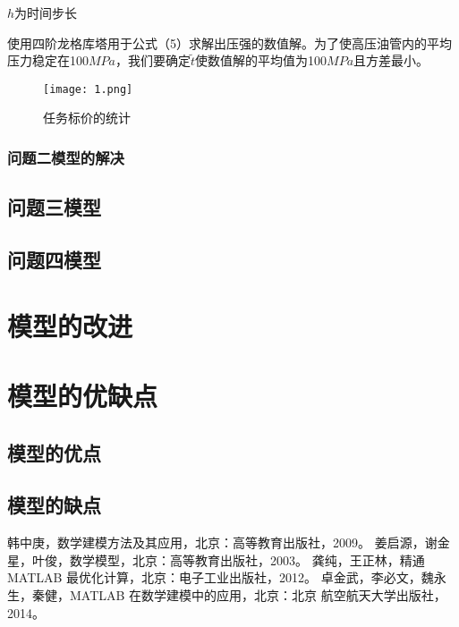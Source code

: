 \documentclass[withoutpreface,bwprint]{cumcmthesis} %
\begin{document}
$h$为时间步长

使用四阶龙格库塔用于公式（5）求解出压强的数值解。为了使高压油管内的平均压力稳定在100$MPa$，我们要确定$\widetilde{t}$使数值解的平均值为100$MPa$且方差最小。
\begin{figure}[!h]
	\centering
	\texttt{[image: 1.png]}
	\caption{任务标价的统计}
\end{figure}




\subsubsection{问题二模型的解决}

 
\subsection{问题三模型}

\subsection{问题四模型}


\section{模型的改进}


\section{模型的优缺点}
\subsection{模型的优点}

\subsection{模型的缺点}



\begin{thebibliography}{9}%
  韩中庚，数学建模方法及其应用，北京：高等教育出版社，2009。 
 姜启源，谢金星，叶俊，数学模型，北京：高等教育出版社，2003。 
 龚纯，王正林，精通 MATLAB 最优化计算，北京：电子工业出版社，2012。 
 卓金武，李必文，魏永生，秦健，MATLAB 在数学建模中的应用，北京：北京 航空航天大学出版社，2014。

\end{thebibliography}
\end{document}
